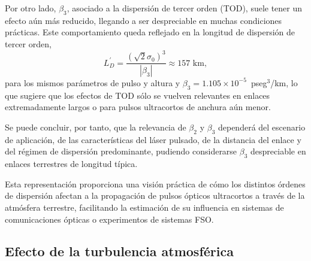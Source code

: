 Por otro lado, $\beta_{3}$, asociado a la dispersión de tercer orden (TOD), suele tener un efecto aún más reducido, llegando a ser despreciable en muchas condiciones prácticas. Este comportamiento queda reflejado en la longitud de dispersión de tercer orden,
\begin{equation}
L_{D}^{\prime}=\frac{\left(\sqrt{2}\sigma_{0}\right)^{3}}{|\beta_{3}|}\approx157\text{ km},
\end{equation}
para los mismos parámetros de pulso y altura y \mbox{$\beta_3=1.105\times 10^{-5}$ pseg$^{3}$/km}, lo que sugiere que los efectos de TOD sólo se vuelven relevantes en enlaces extremadamente largos o para pulsos ultracortos de anchura aún menor.

Se puede concluir, por tanto, que la relevancia de $\beta_{2}$ y $\beta_{3}$ dependerá del escenario de aplicación, de las características del láser pulsado, de la distancia del enlace y del régimen de dispersión predominante, pudiendo considerarse $\beta_{3}$ despreciable en enlaces terrestres de longitud típica.

Esta representación proporciona una visión práctica de cómo los distintos órdenes de dispersión afectan a la propagación de pulsos ópticos ultracortos a través de la atmósfera terrestre, facilitando la estimación de su influencia en sistemas de comunicaciones ópticas o experimentos de sistemas FSO.





\subsection{Efecto de la turbulencia atmosférica}

